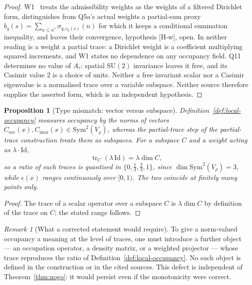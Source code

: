 \documentclass[12pt,a4paper]{article}
\newtheorem{proposition}[theorem]{Proposition}
\theoremstyle{remark}
\newtheorem{remark}[theorem]{Remark}
\theoremstyle{definition}
\DeclareMathOperator{\tr}{tr}
\newcommand{\Sym}{\mathrm{Sym}}
\newcommand{\SU}{\mathrm{SU}}
\begin{document}
    \begin{proof}
      W1~\cite{Beau2026w1} treats the admissibility weights as the weights of a filtered Dirichlet form,
      distinguishes from Q5a's actual weights a partial-sum proxy $b_{q}(s)=\sum_{n\le n^{*}}\sigma_{q,c_q(s)}(n)$
      for which it keeps a conditional summation inequality, and leaves their convergence, hypothesis [H-w], open.
      In neither reading is a weight a partial trace: a Dirichlet weight is a coefficient multiplying squared
      increments, and W1 states no dependence on any occupancy field.
      Q11~\cite{Beau2026q11} determines no value of $A_{\tau}$: spatial $\SU(2)$ invariance leaves it free, and
      its Casimir value $2$ is a choice of units.
      Neither a free invariant scalar nor a Casimir eigenvalue is a normalised trace over a variable subspace.
      Neither source therefore supplies the asserted form, which is an independent hypothesis.
    \end{proof}

    \begin{proposition}[Type mismatch: vector versus subspace]
      \label{prop:type}
      Definition~\ref{def:local-occupancy} measures occupancy by the norms of \emph{vectors}
      $C_{\mathrm{occ}}(x),C_{\mathrm{max}}(x)\in\Sym^{2}(V_{\rho})$, whereas the partial-trace step of
      the partial-trace construction treats them as \emph{subspaces}.
      For a subspace $C$ and a weight acting as $\lambda\cdot\mathrm{Id}$,
      \[
        \tr_{C}(\lambda\,\mathrm{Id})=\lambda\dim C ,
      \]
      so a ratio of such traces is quantised in $\{0,\tfrac13,\tfrac23,1\}$, since
      $\dim\Sym^{2}(V_{\rho})=3$, while $\epsilon(x)$ ranges continuously over $[0,1)$.
      The two coincide at finitely many points only.
    \end{proposition}

    \begin{proof}
      The trace of a scalar operator over a subspace $C$ is $\lambda\dim C$ by definition of the trace
      on $C$; the stated range follows.
    \end{proof}

    \begin{remark}[What a corrected statement would require]
      \label{rem:type-fix}
      To give a norm-valued occupancy a meaning at the level of traces, one must introduce a further
      object --- an occupation operator, a density matrix, or a weighted projector --- whose trace
      reproduces the ratio of Definition~\ref{def:local-occupancy}.
      No such object is defined in the construction or in the cited sources.
      This defect is independent of Theorem~\ref{thm:nogo}: it would persist even if the monotonicity
      were correct.
    \end{remark}
\end{document}
